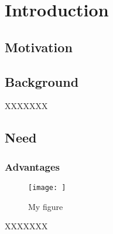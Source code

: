 
\chapter{Introduction}


\section{Motivation}



\section{Background}
XXXXXXX


\section{Need}

\subsection{Advantages}

\begin{figure} [ht]
\centering
\texttt{[image: ]}\\
\caption{My figure}
\label{the-label-for-cross-referencing}
\end{figure}


XXXXXXX










